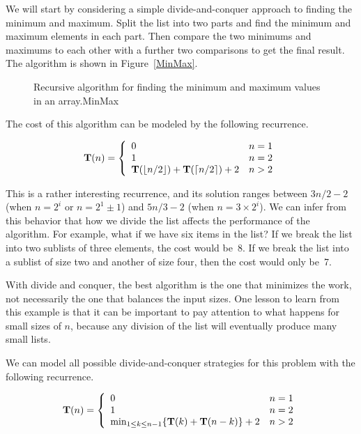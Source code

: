 We will start by considering a simple divide-and-conquer approach to
finding the minimum and maximum.
Split the list into two parts and find the minimum and
maximum elements in each part.
Then compare the two minimums and maximums to each other with a
further two comparisons to get the final result.
The algorithm is shown in Figure~\ref{MinMax}.

\begin{figure}
\vspace{-\bigskipamount}
{Recursive algorithm for finding the minimum and maximum values in an
array.}{MinMax}
\end{figure}

The cost of this algorithm can be modeled by the following recurrence.

\[\mbox{$\textbf{T}(n)$} = \left\{\begin{array}{ll}
		0       & n = 1\\
		1       & n = 2\\
		{\bf T}(\lfloor n/2 \rfloor) + {\bf T}(\lceil n/2
		\rceil) + 2    & n > 2
               \end{array}
        \right. \]

This is a rather interesting recurrence, and its
solution ranges between \(3n/2 - 2\)
(when \(n = 2^i\) or \(n=2^1 \pm 1\))
and \(5n/3 - 2\) (when \(n = 3 \times 2^i\)).
We can infer from this behavior that how we divide the list affects
the performance of the algorithm.
For example, what if we have six items in the list?
If we break the list into two sublists of three elements, the cost
would be~8.
If we break the list into a sublist of size two and another of size
four, then the cost would only be~7.

With divide and conquer, the best algorithm is the one that minimizes
the work, not necessarily the one that balances the input sizes.
One lesson to learn from this example is that it can be important to
pay attention to what happens for small sizes of \(n\), because any
division of the list will eventually produce many small lists.

We can model all possible divide-and-conquer strategies for this
problem with the following recurrence.

{\small
\[\mbox{$\textbf{T}(n)$} = \left\{
\begin{array}{ll}
0&n=1\\
1&n=2\\
\min_{1\leq k\leq n-1} \{{\bf T}(k) + {\bf T}(n-k)\} + 2&n>2
\end{array}\right. \]
}

